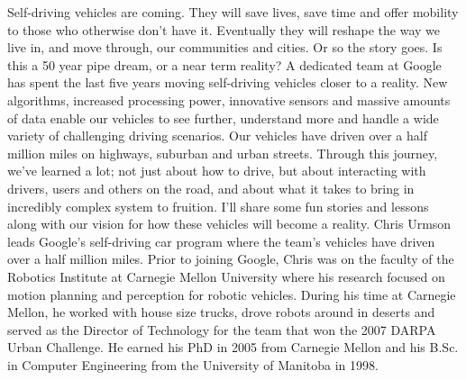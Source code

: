 \vspace{-2cm}
{
Self-driving vehicles are coming. They will save lives, save time and offer mobility to those who otherwise don't have it. Eventually they will reshape the way we live in, and move through, our communities and cities. Or so the story goes. Is this a 50 year pipe dream, or a near term reality? A dedicated team at Google has spent the last five years moving self-driving vehicles closer to a reality. New algorithms, increased processing power, innovative sensors and massive amounts of data enable our vehicles to see further, understand more and handle a wide variety of challenging driving scenarios. Our vehicles have driven over a half million miles on highways, suburban and urban streets. Through this journey, we've learned a lot; not just about how to drive, but about interacting with drivers, users and others on the road, and about what it takes to bring in incredibly complex system to fruition. I'll share some fun stories and lessons along with our vision for how these vehicles will become a reality.
}{
Chris Urmson leads Google's self-driving car program where the team's vehicles have driven over a half million miles. Prior to joining Google, Chris was on the faculty of the Robotics Institute at Carnegie Mellon University where his research focused on motion planning and perception for robotic vehicles. During his time at Carnegie Mellon, he worked with house size trucks, drove robots around in deserts and served as the Director of Technology for the team that won the 2007 DARPA Urban Challenge. He earned his PhD in 2005 from Carnegie Mellon and his B.Sc. in Computer Engineering from the University of Manitoba in 1998.
}





